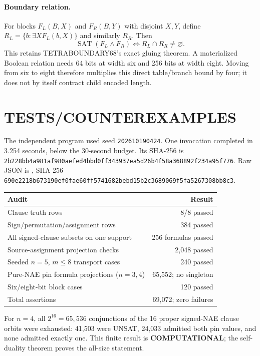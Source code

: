 \documentclass[11pt]{article}
\newcommand{\COMP}{\textbf{COMPUTATIONAL}}
\begin{document}
\paragraph{Boundary relation.}
For blocks $F_L(B,X)$ and $F_R(B,Y)$ with disjoint $X,Y$, define
$R_L=\{b:\exists X F_L(b,X)\}$ and similarly $R_R$.  Then
\[
\operatorname{SAT}(F_L\wedge F_R)\iff R_L\cap R_R\ne\varnothing.
\]
This retains TETRABOUNDARY68's exact gluing theorem.  A materialized Boolean
relation needs 64 bits at width six and 256 bits at width eight.  Moving from
six to eight therefore multiplies this direct table/branch bound by four; it
does not by itself contract child encoded length.

\section{TESTS/COUNTEREXAMPLES}
The independent program
 used seed
\texttt{202610190424}.  One invocation completed in 3.254 seconds, below the
30-second budget.  Its SHA-256 is
\texttt{2b228bb4a981af980aefed4bbd0ff343937ea5d26b4f58a368892f234a95f776}.
Raw JSON is
, SHA-256
\texttt{690e2218b673190ef0fae60ff5741682bebd15b2c3689069f5fa5267308bb8c3}.

\begin{center}
\begin{tabular}{lr}
\toprule
Audit & Result\\
\midrule
Clause truth rows & 8/8 passed\\
Sign/permutation/assignment rows & 384 passed\\
All signed-clause subsets on one support & 256 formulas passed\\
Source-assignment projection checks & 2,048 passed\\
Seeded $n=5$, $m\le8$ transport cases & 240 passed\\
Pure-NAE pin formula projections ($n=3,4$) & 65,552; no singleton\\
Six/eight-bit block cases & 120 passed\\
Total assertions & 69,072; zero failures\\
\bottomrule
\end{tabular}
\end{center}

For $n=4$, all $2^{16}=65,536$ conjunctions of the 16 proper signed-NAE
clause orbits were exhausted: 41,503 were UNSAT, 24,033 admitted both pin
values, and none admitted exactly one.  This finite result is \COMP; the
self-duality theorem proves the all-size statement.
\end{document}
